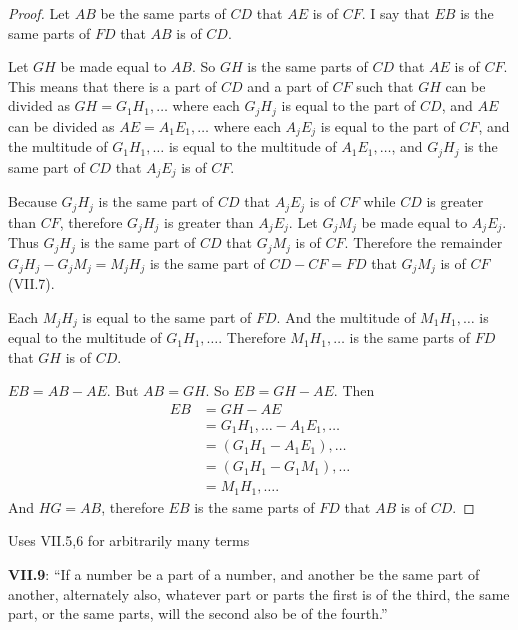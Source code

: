\documentclass{article}
\begin{document}
\begin{proof}
Let $AB$ be the same parts of $CD$ that $AE$ is of $CF$. 
I say that $EB$ is the same parts of $FD$ that $AB$ is of $CD$. 

Let $GH$ be made equal to $AB$.
So $GH$ is the same parts of $CD$ that $AE$ is of $CF$. This means 
that there is a part of $CD$ and a part of $CF$ such that
$GH$ can be divided as $GH=G_1H_1,\ldots$ where each $G_jH_j$ is equal to the part of $CD$,
and $AE$ can be divided as 
$AE=A_1E_1,\ldots$ where each $A_jE_j$ is equal to the part of $CF$,
and the multitude of $G_1H_1,\ldots$ is equal to the multitude of $A_1E_1,\ldots$, and 
$G_jH_j$ is the same part of $CD$ that $A_jE_j$ is of $CF$.

Because $G_jH_j$ is the same part of $CD$ that $A_jE_j$ is of $CF$ while $CD$ is greater than $CF$,
therefore $G_jH_j$ is greater than $A_jE_j$. Let $G_jM_j$ be made equal to $A_jE_j$.
Thus $G_jH_j$ is the same part of $CD$ that $G_jM_j$ is of $CF$.
Therefore the remainder $G_jH_j-G_jM_j=M_jH_j$ is the same part of $CD-CF=FD$ that $G_jM_j$ is of $CF$ (VII.7).

Each $M_jH_j$ is equal to the same part of $FD$. And the multitude of 
$M_1H_1,\ldots$ is equal to the multitude of $G_1H_1,\ldots$. 
Therefore
$M_1H_1,\ldots$ is the same parts of $FD$ that $GH$ is of $CD$.

$EB=AB-AE$. But $AB=GH$. So $EB=GH-AE$. 
Then
\begin{align*}
EB&=GH-AE\\
& = G_1H_1,\ldots - A_1E_1,\ldots\\
&=(G_1H_1-A_1E_1),\ldots\\
&=(G_1H_1-G_1M_1),\ldots\\
&=M_1H_1,\ldots.
\end{align*}
And $HG=AB$, therefore $EB$ is the same parts of $FD$ that $AB$ is of $CD$.
\end{proof}


Uses VII.5,6 for arbitrarily many terms

\textbf{VII.9}: ``If a number be a part of a number, and another be the same part of another, alternately also, whatever part or parts the first is of the third, the same part, or the same parts, will the second also be of the fourth.''
\end{document}
